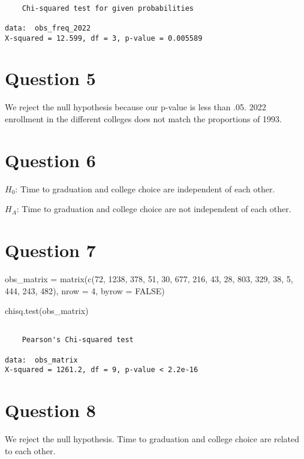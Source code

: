 \documentclass[
  letterpaper,
  DIV=11,
  numbers=noendperiod]{scrartcl}
\newenvironment{Shaded}{\begin{snugshade}}{\end{snugshade}}
\newcommand{\AttributeTok}[1]{\textcolor[rgb]{0.40,0.45,0.13}{#1}}
\newcommand{\ConstantTok}[1]{\textcolor[rgb]{0.56,0.35,0.01}{#1}}
\newcommand{\DecValTok}[1]{\textcolor[rgb]{0.68,0.00,0.00}{#1}}
\newcommand{\FunctionTok}[1]{\textcolor[rgb]{0.28,0.35,0.67}{#1}}
\newcommand{\NormalTok}[1]{\textcolor[rgb]{0.00,0.23,0.31}{#1}}
\newcommand{\OtherTok}[1]{\textcolor[rgb]{0.00,0.23,0.31}{#1}}
\begin{document}
\begin{verbatim}

    Chi-squared test for given probabilities

data:  obs_freq_2022
X-squared = 12.599, df = 3, p-value = 0.005589
\end{verbatim}

\section{Question 5}\label{question-5}

We reject the null hypothesis because our p-value is less than .05. 2022
enrollment in the different colleges does not match the proportions of
1993.

\section{Question 6}\label{question-6}

\(H_0\): Time to graduation and college choice are independent of each
other.

\(H_A\): Time to graduation and college choice are not independent of
each other.

\section{Question 7}\label{question-7}

\begin{Shaded}
\begin{Highlighting}[]
\NormalTok{obs\_matrix }\OtherTok{=} \FunctionTok{matrix}\NormalTok{(}\FunctionTok{c}\NormalTok{(}\DecValTok{72}\NormalTok{, }\DecValTok{1238}\NormalTok{, }\DecValTok{378}\NormalTok{, }\DecValTok{51}\NormalTok{,}
                      \DecValTok{30}\NormalTok{, }\DecValTok{677}\NormalTok{, }\DecValTok{216}\NormalTok{, }\DecValTok{43}\NormalTok{,}
                      \DecValTok{28}\NormalTok{, }\DecValTok{803}\NormalTok{, }\DecValTok{329}\NormalTok{, }\DecValTok{38}\NormalTok{,}
                      \DecValTok{5}\NormalTok{, }\DecValTok{444}\NormalTok{, }\DecValTok{243}\NormalTok{, }\DecValTok{482}\NormalTok{),}
                    \AttributeTok{nrow =} \DecValTok{4}\NormalTok{, }\AttributeTok{byrow =} \ConstantTok{FALSE}\NormalTok{)}

\FunctionTok{chisq.test}\NormalTok{(obs\_matrix)}
\end{Highlighting}
\end{Shaded}

\begin{verbatim}

    Pearson's Chi-squared test

data:  obs_matrix
X-squared = 1261.2, df = 9, p-value < 2.2e-16
\end{verbatim}

\section{Question 8}\label{question-8}

We reject the null hypothesis. Time to graduation and college choice are
related to each other.
\end{document}

